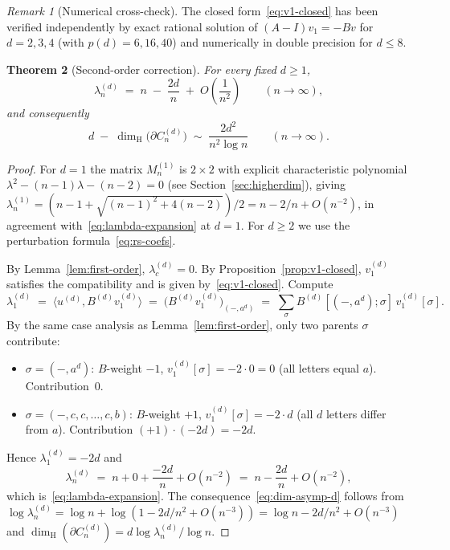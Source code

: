 \documentclass{amsart}
\newtheorem{theorem}{Theorem}[section]
\theoremstyle{definition}
\theoremstyle{remark}
\newtheorem{remark}[theorem]{Remark}
\newcommand{\dH}{\dim_{\mathrm{H}}}
\begin{document}
\begin{remark}[Numerical cross-check]
The closed form~\eqref{eq:v1-closed} has been verified
independently by exact rational solution of $(A - I) v_1 = -B v$
for $d = 2, 3, 4$ (with $p(d) = 6, 16, 40$) and numerically in
double precision for $d \le 8$.
\end{remark}

\begin{theorem}[Second-order correction]
\label{thm:asymp-d}
For every fixed $d \ge 1$,
\begin{equation}\label{eq:lambda-expansion}
  \lambda_n^{(d)} \;=\; n \;-\; \frac{2d}{n} \;+\; O\!\left(
    \frac{1}{n^2}\right)
  \qquad (n \to \infty),
\end{equation}
and consequently
\begin{equation}\label{eq:dim-asymp-d}
  d \;-\; \dH\bigl(\partial C_n^{(d)}\bigr)
    \;\sim\; \frac{2 d^2}{n^2 \log n}
  \qquad (n \to \infty).
\end{equation}
\end{theorem}

\begin{proof}
For $d = 1$ the matrix $M_n^{(1)}$ is $2 \times 2$ with explicit
characteristic polynomial
$\lambda^2 - (n-1)\lambda - (n-2) = 0$
(see Section~\ref{sec:higherdim}), giving
$\lambda_n^{(1)} = (n - 1 + \sqrt{(n-1)^2 + 4(n-2)})/2 =
n - 2/n + O(n^{-2})$, in agreement with~\eqref{eq:lambda-expansion}
at $d = 1$.  For $d \ge 2$ we use the perturbation
formula~\eqref{eq:rs-coefs}.

By Lemma~\ref{lem:first-order}, $\lambda_c^{(d)} = 0$.  By
Proposition~\ref{prop:v1-closed}, $v^{(d)}_1$ satisfies the
compatibility and is given by~\eqref{eq:v1-closed}.  Compute
\[
  \lambda_1^{(d)}
    \;=\; \langle u^{(d)}, B^{(d)} v^{(d)}_1 \rangle
    \;=\; \bigl(B^{(d)} v^{(d)}_1\bigr)_{(-, a^d)}
    \;=\; \sum_{\sigma}
           B^{(d)}[(-, a^d); \sigma] \, v^{(d)}_1[\sigma].
\]
By the same case analysis as
Lemma~\ref{lem:first-order}, only two parents $\sigma$ contribute:
\begin{itemize}
\item $\sigma = (-, a^d)$: $B$-weight $-1$, $v^{(d)}_1[\sigma] =
  -2 \cdot 0 = 0$ (all letters equal $a$).  Contribution~$0$.
\item $\sigma = (-, c, c, \ldots, c, b)$: $B$-weight $+1$,
  $v^{(d)}_1[\sigma] = -2 \cdot d$ (all $d$ letters differ
  from $a$).  Contribution $(+1) \cdot (-2d) = -2d$.
\end{itemize}
Hence $\lambda_1^{(d)} = -2d$ and
\[
  \lambda_n^{(d)} \;=\; n + 0 + \frac{-2d}{n} + O(n^{-2})
                   \;=\; n - \frac{2d}{n} + O(n^{-2}),
\]
which is~\eqref{eq:lambda-expansion}.  The
consequence~\eqref{eq:dim-asymp-d} follows from
$\log \lambda_n^{(d)} = \log n + \log(1 - 2d/n^2 + O(n^{-3}))
= \log n - 2d/n^2 + O(n^{-3})$ and
$\dH(\partial C_n^{(d)}) = d\log \lambda_n^{(d)}/\log n$.
\end{proof}
\end{document}
